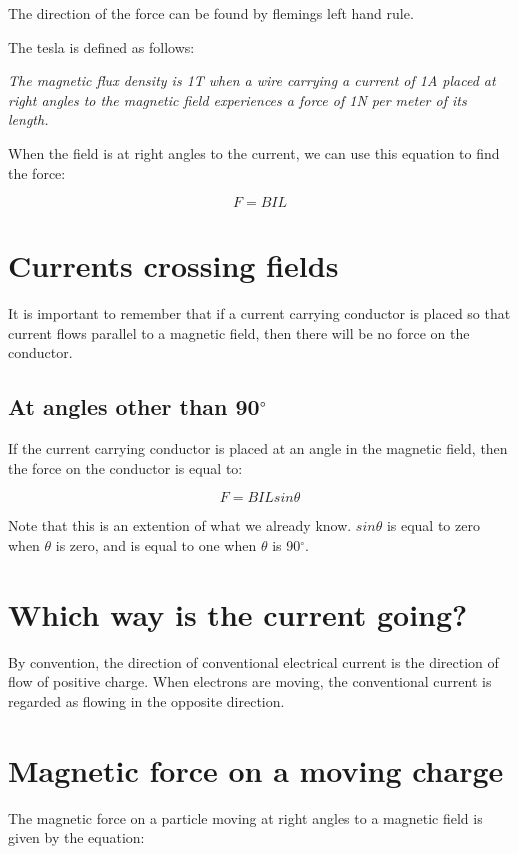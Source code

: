 \documentclass{article}
\begin{document}
The direction of the force can be found by flemings left hand rule.

The tesla is defined as follows:

{\it The magnetic flux density is 1T when a wire carrying a current of 1A placed
at right angles to the magnetic field experiences a force of 1N per meter of
its length.}

When the field is at right angles to the current, we can use this equation to
find the force:

\[
	F = BIL
\]

\section*{Currents crossing fields}

It is important to remember that if a current carrying conductor is placed so
that current flows parallel to a magnetic field, then there will be no force on
the conductor.

\subsection*{At angles other than 90$^\circ$}

If the current carrying conductor is placed at an angle in the magnetic field,
then the force on the conductor is equal to:

\[
	F = BILsin\theta
\]

Note that this is an extention of what we already know. $sin\theta$ is equal to
zero when $\theta$ is zero, and is equal to one when $\theta$ is 90$^\circ$.

\section*{Which way is the current going?}

By convention, the direction of conventional electrical current is the direction
of flow of positive charge. When electrons are moving, the conventional current
is regarded as flowing in the opposite direction.

\section*{Magnetic force on a moving charge}

The magnetic force on a particle moving at right angles to a magnetic field is
given by the equation: 
\end{document}
